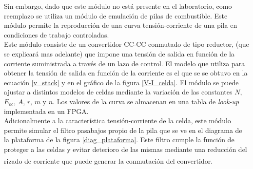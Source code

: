 Sin embargo, dado que este módulo no está presente en el laboratorio, como reemplazo se utiliza un {\Medium módulo de emulación de pilas de combustible}. Este módulo permite la reproducción de una curva tensión-corriente de una pila en condiciones de trabajo controladas.\\

Este módulo consiste de un convertidor CC-CC conmutado de tipo reductor, (que se explicará mas adelante) que impone una tensión de salida en función de la corriente suministrada a través de un lazo de control. El modelo que utiliza para obtener la tensión de salida en función de la corriente es el que se se obtuvo en la ecuación \ref{v_stack} y en el gráfico de la figura \ref{V-I_celda}. El módulo se puede ajustar a distintos modelos de celdas mediante la variación de las constantes $N$, $E_{oc}$, $A$, $r$, $m$ y $n$. Los valores de la curva se almacenan en una tabla de \textit{look-up} implementada en un FPGA.\\

Adicionalmente a la característica tensión-corriente de la celda, este módulo permite simular el filtro pasabajos propio de la pila que se ve en el diagrama de la plataforma de la figura \ref{diag_plataforma}. Este filtro cumple la función de proteger a las celdas y evitar deterioro de las mismas mediante una reducción del rizado de corriente que puede generar la conmutación del convertidor.\textsuperscript{\cite{Argencon2018}}\\